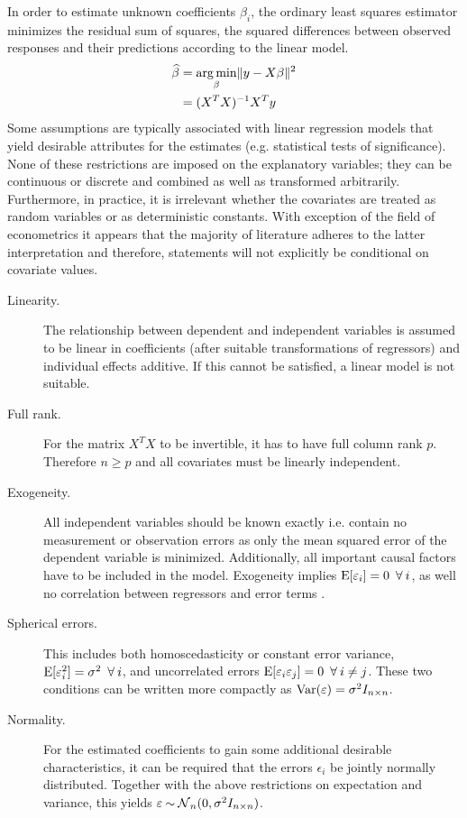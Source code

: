 In order to estimate unknown coefficients $\beta_i$, the ordinary least squares estimator minimizes the residual sum of squares, the squared differences between observed responses and their predictions according to the linear model.
\begin{subequations}
\begin{align}
  \widehat{\beta} &= \operatorname*{arg\, min}_{\beta} \lVert y - X \beta\rVert^2 \\
         &= (X^T X)^{-1} X^T y \label{eq:ols-estimate}
\end{align}
\end{subequations}
Some assumptions are typically associated with linear regression models that yield desirable attributes for the estimates (e.g. statistical tests of significance). None of these restrictions are imposed on the explanatory variables; they can be continuous or discrete and combined as well as transformed arbitrarily. Furthermore, in practice, it is irrelevant whether the covariates are treated as random variables or as deterministic constants. With exception of the field of econometrics it appears that the majority of literature adheres to the latter interpretation and therefore, statements will not explicitly be conditional on covariate values.
\begin{description}
  \item[Linearity.] The relationship between dependent and independent variables is assumed to be linear in coefficients (after suitable transformations of regressors) and individual effects additive. If this cannot be satisfied, a linear model is not suitable.
  \item[Full rank.] For the matrix $X^T X$ to be invertible, it has to have full column rank $p$. Therefore $n \geq p$ and all covariates must be linearly independent.
  \item[Exogeneity.] All independent variables should be known exactly i.e. contain no measurement or observation errors as only the mean squared error of the dependent variable is minimized. Additionally, all important causal factors have to be included in the model. Exogeneity implies $\E[\epsilon_i] = 0 \forall i$, as well no correlation between regressors and error terms \citep{Hayashi2000}.
  \item[Spherical errors.] This includes both homoscedasticity or constant error variance, $\E[\epsilon_i^2] = \sigma^2 \forall i$, and uncorrelated errors $\E[\epsilon_i \epsilon_j] = 0 \forall i \neq j$. These two conditions can be written more compactly as $\operatorname{Var}(\varepsilon) = \sigma^2I_{n \times n}$.
  \item[Normality.] For the estimated coefficients to gain some additional desirable characteristics, it can be required that the errors $\epsilon_i$ be jointly normally distributed. Together with the above restrictions on expectation and variance, this yields $\varepsilon \mathbin{\sim} \operatorname{\mathcal{N}}_n(0, \sigma^2 I_{n \times n})$.
\end{description}

